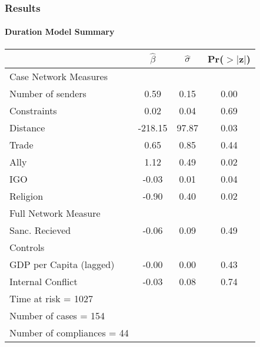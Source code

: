 \documentclass{beamer}
\begin{document}
\begin{frame}
\frametitle{Results}
\framesubtitle{Duration Model Summary}

%

\begin{table}[ht]
\begin{center}
\begin{tabular}{lccc}
  \hline\hline
 &$\hat{\beta}$&$\hat{\sigma}$& Pr($>$$|$z$|$) \\ 
  \hline
  Case Network Measures \\
  \;\;\;   Number of senders & 0.59 & 0.15 & 0.00 \\ 
  \;\;\;   Constraints & 0.02 & 0.04 & 0.69 \\ 
  \;\;\;   Distance & -218.15 & 97.87 & 0.03 \\
  \;\;\;   Trade & 0.65 & 0.85 & 0.44 \\ 
  \;\;\;   Ally & 1.12 & 0.49 & 0.02 \\ 
  \;\;\;   IGO & -0.03 & 0.01 & 0.04 \\ 
  \;\;\;   Religion & -0.90 & 0.40 & 0.02 \\ 
  Full Network Measure \\
  \;\;\;     Sanc. Recieved & -0.06 & 0.09 & 0.49 \\ 
  Controls \\
  \;\;\;     GDP per Capita (lagged) & -0.00 & 0.00 & 0.43 \\ 
  \;\;\;     Internal Conflict & -0.03 & 0.08 & 0.74 \\ 
   \hline
   Time at risk = 1027 &&&\\
	 Number of cases = 154 &&&\\
   Number of compliances = 44 &&&\\
  \hline\hline
\end{tabular}
\end{center}
\end{table}


\end{frame}

\end{document}
